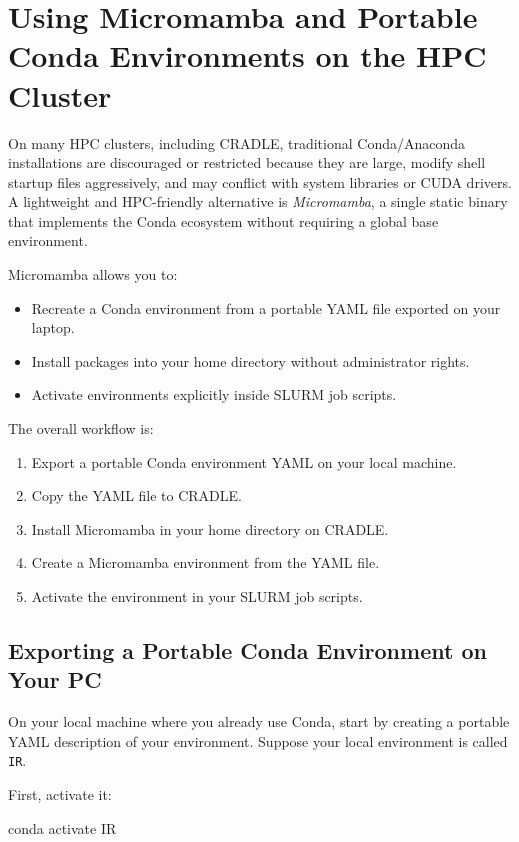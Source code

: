 \documentclass[11pt]{article}
\begin{document}
\section{Using Micromamba and Portable Conda Environments on the HPC Cluster}
\label{sec:micromamba}

On many HPC clusters, including CRADLE, traditional Conda/Anaconda installations
are discouraged or restricted because they are large, modify shell startup
files aggressively, and may conflict with system libraries or CUDA drivers.
A lightweight and HPC-friendly alternative is \emph{Micromamba},
a single static binary that implements the Conda ecosystem without requiring
a global base environment.

Micromamba allows you to:
\begin{itemize}
  \item Recreate a Conda environment from a portable YAML file exported on your laptop.
  \item Install packages into your home directory without administrator rights.
  \item Activate environments explicitly inside SLURM job scripts.
\end{itemize}

The overall workflow is:
\begin{enumerate}
  \item Export a portable Conda environment YAML on your local machine.
  \item Copy the YAML file to CRADLE.
  \item Install Micromamba in your home directory on CRADLE.
  \item Create a Micromamba environment from the YAML file.
  \item Activate the environment in your SLURM job scripts.
\end{enumerate}

\subsection{Exporting a Portable Conda Environment on Your PC}
\label{subsec:export-conda}

On your local machine where you already use Conda, start by creating
a portable YAML description of your environment. Suppose your local
environment is called \texttt{IR}.

First, activate it:\\
\begin{codeblock}
conda activate IR
\end{codeblock}
\end{document}
